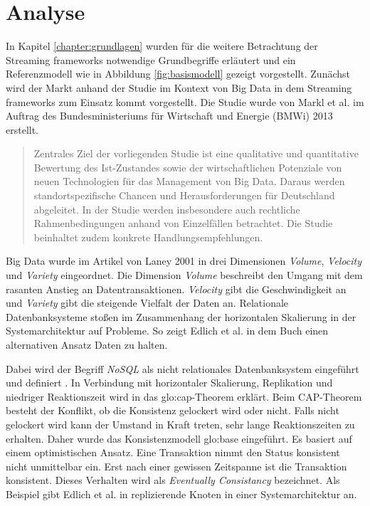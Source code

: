 \chapter{Analyse}
\label{chapter:analyse}

In Kapitel \ref{chapter:grundlagen} wurden für die weitere Betrachtung der Streaming frameworks notwendige Grundbegriffe erläutert und ein Referenzmodell wie in Abbildung \ref{fig:basismodell} gezeigt vorgestellt. Zunächst wird der Markt anhand der Studie  im Kontext von Big Data in dem Streaming frameworks zum Einsatz kommt vorgestellt. Die Studie  wurde von Markl et al. im Auftrag des Bundesministeriums für Wirtschaft und Energie (BMWi) 2013 erstellt. 

\begin{quote}
Zentrales Ziel der vorliegenden Studie ist eine qualitative und quantitative Bewertung des Ist-Zustandes sowie der wirtschaftlichen Potenziale von neuen Technologien für das Management von Big Data. Daraus werden standortspezifische Chancen und Herausforderungen für Deutschland abgeleitet. In der Studie werden insbesondere auch rechtliche Rahmenbedingungen anhand von Einzelfällen betrachtet. Die Studie beinhaltet zudem konkrete Handlungsempfehlungen. 
\end{quote}

Big Data wurde im Artikel  von Laney 2001 in drei Dimensionen \textit{Volume}, \textit{Velocity} und \textit{Variety} eingeordnet. Die Dimension \textit{Volume} beschreibt den Umgang mit dem rasanten Anstieg an Datentransaktionen. \textit{Velocity} gibt die Geschwindigkeit an und \textit{Variety} gibt die steigende Vielfalt der Daten an. Relationale Datenbanksysteme stoßen im Zusammenhang der horizontalen Skalierung in der Systemarchitektur auf Probleme. So zeigt Edlich et al. in dem Buch  einen alternativen Ansatz Daten zu halten. 

Dabei wird der Begriff \textit{NoSQL} als nicht relationales Datenbanksystem eingeführt und definiert . In Verbindung mit horizontaler Skalierung, Replikation und niedriger Reaktionszeit wird in  das \gls{glo:cap}-Theorem erklärt. Beim CAP-Theorem besteht der Konflikt, ob die Konsistenz gelockert wird oder nicht. Falls nicht gelockert wird kann der Umstand in Kraft treten, sehr lange Reaktionszeiten zu erhalten. Daher wurde das Konsistenzmodell \gls{glo:base} eingeführt. Es basiert auf einem optimistischen Ansatz. Eine Transaktion nimmt den Status konsistent nicht unmittelbar ein. Erst nach einer gewissen Zeitspanne ist die Transaktion konsistent. Dieses Verhalten wird als \textit{Eventually Consistancy} bezeichnet. Als Beispiel gibt Edlich et al. in  replizierende Knoten in einer Systemarchitektur an. 

